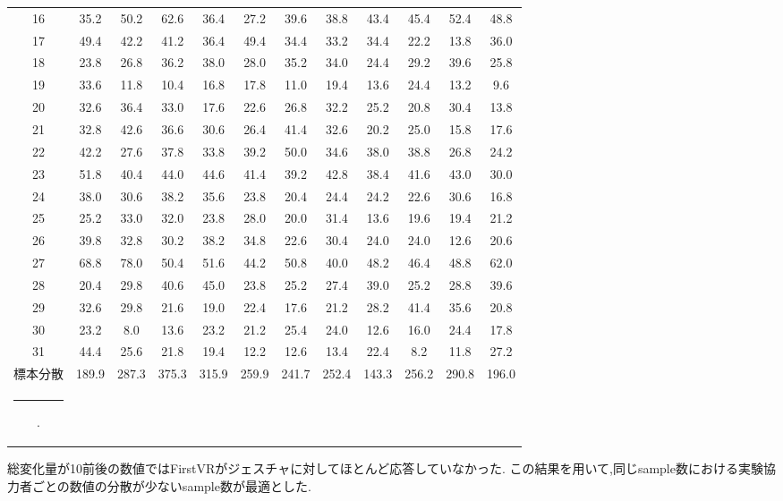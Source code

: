 \documentclass{ltjsreport}
\makeatletter
\def\Hline{
  \noalign{\ifnum0=`}\fi\hrule \@height 3.\arrayrulewidth \futurelet
  \reserved@a\@xhline}
\makeatother
\begin{document}
\begin{table}[H]
\begin{center}
\begin{tabular}{c|ccccccccccc}
			16 & 35.2 & 50.2 & 62.6 & 36.4 & 27.2 & 39.6 & 38.8 & 43.4 & 45.4 & 52.4 & 48.8 \\
			17 & 49.4 & 42.2 & 41.2 & 36.4 & 49.4 & 34.4 & 33.2 & 34.4 & 22.2 & 13.8 & 36.0 \\
			18 & 23.8 & 26.8 & 36.2 & 38.0 & 28.0 & 35.2 & 34.0 & 24.4 & 29.2 & 39.6 & 25.8 \\
			19 & 33.6 & 11.8 & 10.4 & 16.8 & 17.8 & 11.0 & 19.4 & 13.6 & 24.4 & 13.2 & 9.6 \\
			20 & 32.6 & 36.4 & 33.0 & 17.6 & 22.6 & 26.8 & 32.2 & 25.2 & 20.8 & 30.4 & 13.8 \\
			21 & 32.8 & 42.6 & 36.6 & 30.6 & 26.4 & 41.4 & 32.6 & 20.2 & 25.0 & 15.8 & 17.6 \\
			22 & 42.2 & 27.6 & 37.8 & 33.8 & 39.2 & 50.0 & 34.6 & 38.0 & 38.8 & 26.8 & 24.2 \\
			23 & 51.8 & 40.4 & 44.0 & 44.6 & 41.4 & 39.2 & 42.8 & 38.4 & 41.6 & 43.0 & 30.0 \\
			24 & 38.0 & 30.6 & 38.2 & 35.6 & 23.8 & 20.4 & 24.4 & 24.2 & 22.6 & 30.6 & 16.8 \\
			25 & 25.2 & 33.0 & 32.0 & 23.8 & 28.0 & 20.0 & 31.4 & 13.6 & 19.6 & 19.4 & 21.2 \\
			26 & 39.8 & 32.8 & 30.2 & 38.2 & 34.8 & 22.6 & 30.4 & 24.0 & 24.0 & 12.6 & 20.6 \\
			27 & 68.8 & 78.0 & 50.4 & 51.6 & 44.2 & 50.8 & 40.0 & 48.2 & 46.4 & 48.8 & 62.0 \\
			28 & 20.4 & 29.8 & 40.6 & 45.0 & 23.8 & 25.2 & 27.4 & 39.0 & 25.2 & 28.8 & 39.6 \\
			29 & 32.6 & 29.8 & 21.6 & 19.0 & 22.4 & 17.6 & 21.2 & 28.2 & 41.4 & 35.6 & 20.8 \\
			30 & 23.2 & 8.0 & 13.6 & 23.2 & 21.2 & 25.4 & 24.0 & 12.6 & 16.0 & 24.4 & 17.8 \\
			31 & 44.4 & 25.6 & 21.8 & 19.4 & 12.2 & 12.6 & 13.4 & 22.4 & 8.2 & 11.8 & 27.2 \\ \hline
			標本分散&189.9 & 287.3 & 375.3 & 315.9 & 259.9 & 241.7 & 252.4 & 143.3 & 256.2 & 290.8 & 196.0 \\ \Hline
			
		\end{tabular}
		\end{center}
		\end{table}
		\vspace{-5pt}
		総変化量が10前後の数値ではFirstVRがジェスチャに対してほとんど応答していなかった.
		この結果を用いて,同じsample数における実験協力者ごとの数値の分散が少ないsample数が最適とした.
\end{document}

